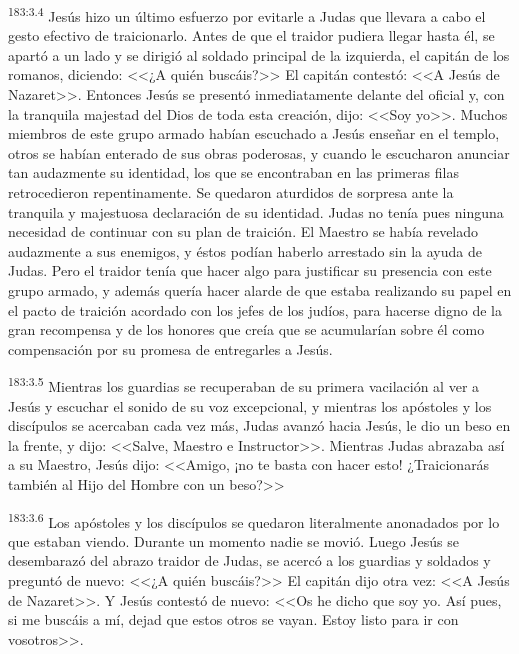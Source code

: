 \par 
\textsuperscript{183:3.4} Jesús hizo un último esfuerzo por evitarle a Judas que llevara a cabo el gesto efectivo de traicionarlo. Antes de que el traidor pudiera llegar hasta él, se apartó a un lado y se dirigió al soldado principal de la izquierda, el capitán de los romanos, diciendo: <<¿A quién buscáis?>> El capitán contestó: <<A Jesús de Nazaret>>. Entonces Jesús se presentó inmediatamente delante del oficial y, con la tranquila majestad del Dios de toda esta creación, dijo: <<Soy yo>>. Muchos miembros de este grupo armado habían escuchado a Jesús enseñar en el templo, otros se habían enterado de sus obras poderosas, y cuando le escucharon anunciar tan audazmente su identidad, los que se encontraban en las primeras filas retrocedieron repentinamente. Se quedaron aturdidos de sorpresa ante la tranquila y majestuosa declaración de su identidad. Judas no tenía pues ninguna necesidad de continuar con su plan de traición. El Maestro se había revelado audazmente a sus enemigos, y éstos podían haberlo arrestado sin la ayuda de Judas. Pero el traidor tenía que hacer algo para justificar su presencia con este grupo armado, y además quería hacer alarde de que estaba realizando su papel en el pacto de traición acordado con los jefes de los judíos, para hacerse digno de la gran recompensa y de los honores que creía que se acumularían sobre él como compensación por su promesa de entregarles a Jesús.

\par 
\textsuperscript{183:3.5} Mientras los guardias se recuperaban de su primera vacilación al ver a Jesús y escuchar el sonido de su voz excepcional, y mientras los apóstoles y los discípulos se acercaban cada vez más, Judas avanzó hacia Jesús, le dio un beso en la frente, y dijo: <<Salve, Maestro e Instructor>>. Mientras Judas abrazaba así a su Maestro, Jesús dijo: <<Amigo, ¡no te basta con hacer esto! ¿Traicionarás también al Hijo del Hombre con un beso?>>

\par 
\textsuperscript{183:3.6} Los apóstoles y los discípulos se quedaron literalmente anonadados por lo que estaban viendo. Durante un momento nadie se movió. Luego Jesús se desembarazó del abrazo traidor de Judas, se acercó a los guardias y soldados y preguntó de nuevo: <<¿A quién buscáis?>> El capitán dijo otra vez: <<A Jesús de Nazaret>>. Y Jesús contestó de nuevo: <<Os he dicho que soy yo. Así pues, si me buscáis a mí, dejad que estos otros se vayan. Estoy listo para ir con vosotros>>.

